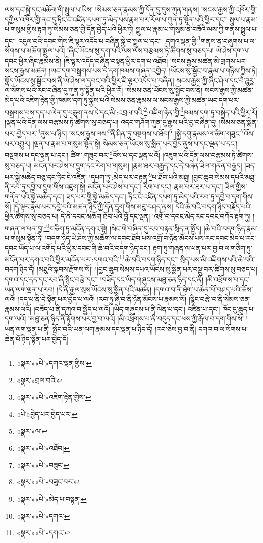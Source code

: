 ལས་དང་སྐྱེ་དང་མཆོག་གི་སྤྲུལ་པ་ཡིས། །སེམས་ཅན་རྣམས་ཀྱི་དོན་དུ་དུས་ཀུན་གནས། །སངས་རྒྱས་ཀྱི་འཁོར་གྱི་དཀྱིལ་འཁོར་གྱི་ནང་དུ་ཏིང་ངེ་འཛིན་དཔག་ཏུ་མེད་པས་རྣམ་པར་རོལ་པ་ཀུན་ཏུ་སྟོན་པའི་ཕྱིར་དང་། སྤྲུལ་པ་རྣམ་པ་གསུམ་གྱིས་རྟག་ཏུ་སེམས་ཅན་གྱི་དོན་བྱེད་པའི་ཕྱིར་ཏེ། སྤྲུལ་པ་རྣམ་པ་གསུམ་ནི་བཟོའི་ལས་ཀྱི་གནས་སྤྲུལ་པ་དང་། འདུལ་བའི་དབང་གིས་ཇི་ལྟར་འདོད་པ་བཞིན་སྐྱེ་བ་སྤྲུལ་པ་དང་། :དགའ་ལྡན་གྱི་\footnote{«སྣར་»«པེ་»དགའ་ལྡན་གྱིས་}གནས་ན་བཞུགས་པ་ལ་སོགས་པ་མཆོག་སྤྲུལ་པའོ། །ཞིང་ཡོངས་སུ་དག་པའི་ལས་ལས་བརྩམས་ཏེ་ཚིགས་སུ་བཅད་པ། ཡེ་ཤེས་དག་ལ་དབང་ཕྱིར་ཞིང་རྣམས་ནི། །ཇི་ལྟར་འདོད་བཞིན་བསྟན་ཕྱིར་དག་པ་འཐོབ། །སངས་རྒྱས་མཚན་མི་གྲགས་པར་སངས་རྒྱས་མཚན། །ཡང་དག་བསྒྲགས་པས་དེ་དག་ཁམས་གཞན་འགྱེད། །ཡོངས་སུ་སྦྱོང་བ་རྣམ་པ་གཉིས་ཀྱིས་ཏེ། སྣོད་ཡོངས་སུ་སྦྱོང་བས་ནི་ཡེ་ཤེས་ལ་དབང་བའི་ཕྱིར་ཇི་ལྟར་འདོད་པ་བཞིན། སངས་རྒྱས་ཀྱི་ཞིང་ཤེལ་དང་བཻ་ཌཱུརྱ་ལ་སོགས་པའི་རང་བཞིན་དུ་ཀུན་ཏུ་སྟོན་པའི་ཕྱིར་རོ། །སེམས་ཅན་ཡོངས་སུ་སྦྱོང་བས་ནི། སངས་རྒྱས་ཀྱི་མཚན་མེད་པའི་འཇིག་རྟེན་གྱི་ཁམས་དག་ཏུ་སྐྱེས་པའི་སེམས་ཅན་རྣམས་ལ་སངས་རྒྱས་ཀྱི་མཚན་ཡང་དག་པར་བསྒྲགས་པས་དད་པ་ལེན་དུ་བཅུག་ནས་དེ་དང་མི་:འབྲལ་བའི་\footnote{«སྣར་»བྲལ་བའི་}:འཇིག་རྟེན་གྱི་\footnote{«སྣར་»«པེ་»འཇིག་རྟེན་གྱིས་}ཁམས་དག་ཏུ་བསྐྱེད་པའི་ཕྱིར་རོ། །ལྡན་པའི་དོན་ལས་བརྩམས་ཏེ་ཚིགས་སུ་བཅད་པ། འདབ་གཤོག་ཀུན་དུ་རྒྱས་པའི་བྱ་བཞིན་དུ། །སེམས་ཅན་སྨིན་པར་:བྱེད་པར་\footnote{«པེ་»བྱེད་པར་བྱེད་པར་}ནུས་པ་ཉིད། །སངས་རྒྱས་ལས་\footnote{«སྣར་»ལ་}ནི་ཤིན་ཏུ་བསྔགས་པ་ཐོབ།\footnote{«སྣར་»«པེ་»འཐོབ།} །སྐྱེ་དགུ་རྣམས་ལ་ཚིག་གཟུང་\footnote{«སྣར་»«པེ་»བཟུང་}འོས་པར་འགྱུར། །ལྡན་པ་རྣམ་པ་གསུམ་སྟོན་སྟེ། སེམས་ཅན་ཡོངས་སུ་སྨིན་པར་བྱེད་ནུས་པ་དང་ལྡན་པ་དང་། བསྔགས་པ་དང་ལྡན་པ་དང་། ཚིག་:གཟུང་བར་\footnote{«སྣར་»«པེ་»བཟུང་བར་}འོས་པ་དང་ལྡན་པའོ། །འཇུག་པའི་དོན་ལས་བརྩམས་ཏེ་ཚིགས་སུ་བཅད་པ། མངོན་པར་ཤེས་པ་དྲུག་དང་རིག་པ་གསུམ། །རྣམ་ཐར་བརྒྱད་དང་དེ་བཞིན་ཟིལ་གནོན་བརྒྱད། །ཟད་པར་སྐྱེ་མཆེད་བཅུ་དང་ཏིང་ངེ་འཛིན། །དཔག་ཏུ་:མེད་པར་བརྟན་\footnote{«སྣར་»«པེ་»མེད་པ་བསྟན་}པ་ཐོབ་པའི་མཐུ། །བྱང་ཆུབ་སེམས་དཔའི་མཐུ་ནི་རབ་ཏུ་དབྱེ་བ་དྲུག་གིས་འཇུག་སྟེ། མངོན་པར་ཤེས་པ་དང་། རིག་པ་དང་། རྣམ་པར་ཐར་པ་དང་། ཟིལ་གྱིས་གནོན་པའི་སྐྱེ་མཆེད་དང་། ཟད་པར་གྱི་སྐྱེ་མཆེད་དང་། ཏིང་ངེ་འཛིན་དཔག་ཏུ་མེད་པའི་རབ་ཏུ་དབྱེ་བ་དག་གིས་སོ། །དེ་ལྟར་རྣམ་པར་དབྱེ་བའི་མཚན་ཉིད་ཀྱི་དོན་དྲུག་གིས་མཐུ་བཤད་ནས། དེའི་ཆེ་བའི་བདག་ཉིད་བརྗོད་པའི་ཕྱིར་ཚིགས་སུ་བཅད་པ། དེ་ནི་དབང་མཆོག་ཐོབ་པའི་བློ་དང་ལྡན། །འགྲོ་བ་དབང་མེད་རང་དབང་བཀོད་རྟག་ཏུ། །གཞན་ལ་ཕན་བྱ་\footnote{«སྣར་»«པེ་»དགའ་}གཅིག་ཏུ་མངོན་དགའ་སྟེ། །སེང་གེ་བཞིན་དུ་རབ་བརྟན་སྲིད་ན་སྤྱོད། །ཆེ་བའི་བདག་ཉིད་རྣམ་པ་གསུམ་སྟོན་ཏེ། །བདག་ཉིད་ཡེ་ཤེས་ཀྱི་མཆོག་ལ་དབང་ཐོབ་པས་འགྲོ་བ་ཉོན་མོངས་པས་རང་དབང་མེད་པ་རང་དབང་ཡོད་པ་ལ་འགོད་པའི་ཕྱིར་དབང་གི་ཆེ་བའི་བདག་ཉིད་དང་། རྟག་ཏུ་གཞན་ལ་ཕན་པར་བྱ་བ་ལ་གཅིག་ཏུ་མངོན་པར་དགའ་བའི་ཕྱིར་མངོན་པར་:དགའ་བའི་\footnote{«སྣར་»«པེ་»དགའ་}ཆེ་བའི་བདག་ཉིད་དང་། སྲིད་པས་མི་འཇིགས་པའི་ཆེ་བའི་བདག་ཉིད་དོ། །མཐུའི་སྐབས་རྫོགས་སོ།། །།བྱང་ཆུབ་སེམས་དཔའ་ཡོངས་སུ་སྨིན་པར་བསྡུ་བར་ཚིགས་སུ་བཅད་པ། དགའ་དང་དད་དང་རབ་ཞི་སྙིང་བརྩེ་དང་། །བཟོད་དང་ཡིད་གཞུངས་མཐུ་ཅན་ཉིད་དང་ནི། །མི་འཕྲོགས་པ་དང་ཡན་ལག་ལྡན་པ་རབ། །དེ་ནི་རྒྱལ་སྲས་ཡོངས་སུ་སྨིན་པའི་མཚན། །དགའ་བ་ནི་ཐེག་པ་ཆེན་པོ་བཤད་པའི་ཆོས་ལའོ། །དད་པ་ནི་དེ་སྟོན་པར་བྱེད་པ་ལའོ། །རབ་ཏུ་ཞི་བ་ནི་ཉོན་མོངས་པ་རྣམས་སོ། །སྙིང་བརྩེ་བ་ནི་སེམས་ཅན་རྣམས་ལའོ། །བཟོད་པ་ནི་དཀའ་བ་སྤྱོད་པ་ལའོ། །ཡིད་གཞུངས་པ་ནི་ལེན་པ་དང་། འཛིན་པ་དང་། ཁོང་དུ་ཆུད་པ་དག་ལའོ། །མཐུ་ཅན་ཉིད་ནི་རྟོགས་པར་བྱ་བ་ལའོ། །མི་འཕྲོགས་པ་ནི་བདུད་དང་ཕས་ཀྱི་རྒོལ་བ་དག་གིས་སོ། །ཡན་ལག་ལྡན་པ་ནི། སྤོང་བའི་ཡན་ལག་རྣམས་དང་ལྡན་པ་ཉིད་དོ། །རབ་ཅེས་བྱ་བ་ནི། དགའ་བ་ལ་སོགས་པ་ཆེན་པོ་ཉིད་སྟོན་པར་བྱེད་དོ། 